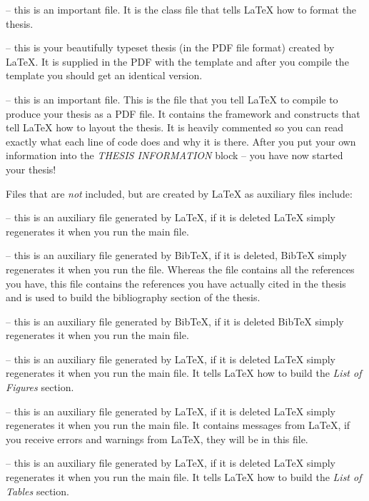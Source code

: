  -- this is an important file. It is the class file that tells \LaTeX{} how to format the thesis. 

 -- this is your beautifully typeset thesis (in the PDF file format) created by \LaTeX{}.
It is supplied in the PDF with the template and after you compile the template you should get an identical version.

 -- this is an important file.
This is the file that you tell \LaTeX{} to compile to produce your thesis as a PDF file.
It contains the framework and constructs that tell \LaTeX{} how to layout the thesis.
It is heavily commented so you can read exactly what each line of code does and why it is there.
After you put your own information into the \emph{THESIS INFORMATION} block -- you have now started your thesis!

Files that are \emph{not} included, but are created by \LaTeX{} as auxiliary files include:

 -- this is an auxiliary file generated by \LaTeX{}, if it is deleted \LaTeX{} simply regenerates it when you run the main  file.

 -- this is an auxiliary file generated by BibTeX, if it is deleted, BibTeX simply regenerates it when you run the  file.
Whereas the  file contains all the references you have, this  file contains the references you have actually cited in the thesis and is used to build the bibliography section of the thesis.

 -- this is an auxiliary file generated by BibTeX, if it is deleted BibTeX simply regenerates it when you run the main  file.

 -- this is an auxiliary file generated by \LaTeX{}, if it is deleted \LaTeX{} simply regenerates it when you run the main  file.
It tells \LaTeX{} how to build the \emph{List of Figures} section.

 -- this is an auxiliary file generated by \LaTeX{}, if it is deleted \LaTeX{} simply regenerates it when you run the main  file.
It contains messages from \LaTeX{}, if you receive errors and warnings from \LaTeX{}, they will be in this  file.

 -- this is an auxiliary file generated by \LaTeX{}, if it is deleted \LaTeX{} simply regenerates it when you run the main  file.
It tells \LaTeX{} how to build the \emph{List of Tables} section.

